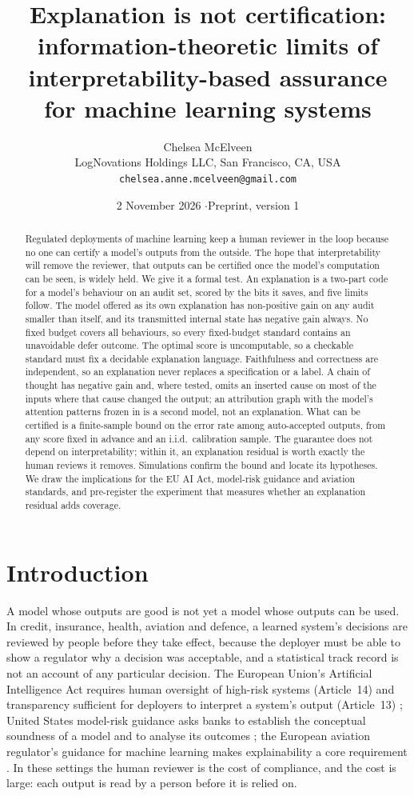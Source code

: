 \documentclass[11pt,letterpaper]{article}
\title{\LARGE\bfseries Explanation is not certification:\\[2pt]
\Large information-theoretic limits of interpretability-based assurance\\ for machine learning systems}
\author{Chelsea McElveen\\[2pt]
\small LogNovations Holdings LLC, San Francisco, CA, USA\\
\small \texttt{chelsea.anne.mcelveen@gmail.com}}
\date{\small 2 November 2026 \quad$\cdot$\quad Preprint, version 1}
\theoremstyle{plain}
\theoremstyle{definition}
\theoremstyle{remark}
\begin{document}
\maketitle

\begin{abstract}
\noindent
Regulated deployments of machine learning keep a human reviewer in the loop because no one can certify a model's outputs from the outside. The hope that interpretability will remove the reviewer, that outputs can be certified once the model's computation can be seen, is widely held. We give it a formal test. An explanation is a two-part code for a model's behaviour on an audit set, scored by the bits it saves, and five limits follow. The model offered as its own explanation has non-positive gain on any audit smaller than itself, and its transmitted internal state has negative gain always. No fixed budget covers all behaviours, so every fixed-budget standard contains an unavoidable defer outcome. The optimal score is uncomputable, so a checkable standard must fix a decidable explanation language. Faithfulness and correctness are independent, so an explanation never replaces a specification or a label. A chain of thought has negative gain and, where tested, omits an inserted cause on most of the inputs where that cause changed the output; an attribution graph with the model's attention patterns frozen in is a second model, not an explanation. What can be certified is a finite-sample bound on the error rate among auto-accepted outputs, from any score fixed in advance and an i.i.d.\ calibration sample. The guarantee does not depend on interpretability; within it, an explanation residual is worth exactly the human reviews it removes. Simulations confirm the bound and locate its hypotheses. We draw the implications for the EU AI Act, model-risk guidance and aviation standards, and pre-register the experiment that measures whether an explanation residual adds coverage.
\end{abstract}

\section{Introduction}

A model whose outputs are good is not yet a model whose outputs can be used. In credit, insurance, health, aviation and defence, a learned system's decisions are reviewed by people before they take effect, because the deployer must be able to show a regulator why a decision was acceptable, and a statistical track record is not an account of any particular decision. The European Union's Artificial Intelligence Act requires human oversight of high-risk systems (Article~14) and transparency sufficient for deployers to interpret a system's output (Article~13) \citep{euaiact2024}; United States model-risk guidance asks banks to establish the conceptual soundness of a model and to analyse its outcomes \citep{sr117}; the European aviation regulator's guidance for machine learning makes explainability a core requirement \citep{easa2024}. In these settings the human reviewer is the cost of compliance, and the cost is large: each output is read by a person before it is relied on.
\end{document}
